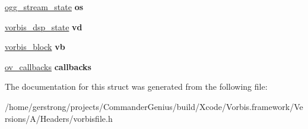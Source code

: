 \begin{DoxyCompactItemize}
\item 
\hypertarget{struct_ogg_vorbis___file_a8658f17a6f662a74f8763c47d560d712}{
\hyperlink{structogg__stream__state}{ogg\_\-stream\_\-state} {\bfseries os}}
\label{struct_ogg_vorbis___file_a8658f17a6f662a74f8763c47d560d712}

\item 
\hypertarget{struct_ogg_vorbis___file_acb9d38719f54642d1a39f24203b466d6}{
\hyperlink{structvorbis__dsp__state}{vorbis\_\-dsp\_\-state} {\bfseries vd}}
\label{struct_ogg_vorbis___file_acb9d38719f54642d1a39f24203b466d6}

\item 
\hypertarget{struct_ogg_vorbis___file_a3201599977a781b7bf559167cd892638}{
\hyperlink{structvorbis__block}{vorbis\_\-block} {\bfseries vb}}
\label{struct_ogg_vorbis___file_a3201599977a781b7bf559167cd892638}

\item 
\hypertarget{struct_ogg_vorbis___file_afb1474e24193f577dd21395a76199415}{
\hyperlink{structov__callbacks}{ov\_\-callbacks} {\bfseries callbacks}}
\label{struct_ogg_vorbis___file_afb1474e24193f577dd21395a76199415}

\end{DoxyCompactItemize}


The documentation for this struct was generated from the following file:\begin{DoxyCompactItemize}
\item 
/home/gerstrong/projects/CommanderGenius/build/Xcode/Vorbis.framework/Versions/A/Headers/vorbisfile.h\end{DoxyCompactItemize}
